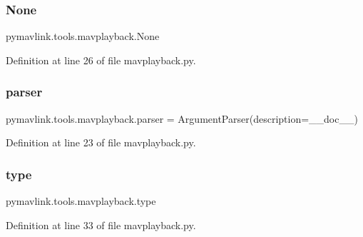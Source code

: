 \subsubsection{\texorpdfstring{None}{None}}
{\footnotesize\ttfamily pymavlink.\+tools.\+mavplayback.\+None}



Definition at line 26 of file mavplayback.\+py.

\mbox{\label{namespacepymavlink_1_1tools_1_1mavplayback_ac18db8fa1ca9b23e48f60e5e96e4c551}} 
\subsubsection{\texorpdfstring{parser}{parser}}
{\footnotesize\ttfamily pymavlink.\+tools.\+mavplayback.\+parser = Argument\+Parser(description=\+\_\+\+\_\+doc\+\_\+\+\_\+)}



Definition at line 23 of file mavplayback.\+py.

\mbox{\label{namespacepymavlink_1_1tools_1_1mavplayback_a42b5bf06ac5152039a7d8135d608857c}} 
\subsubsection{\texorpdfstring{type}{type}}
{\footnotesize\ttfamily pymavlink.\+tools.\+mavplayback.\+type}



Definition at line 33 of file mavplayback.\+py.

